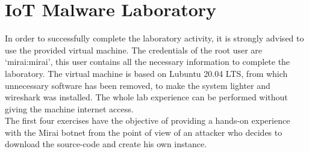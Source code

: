 \chapter{IoT Malware Laboratory}
In order to successfully complete the laboratory activity, it is strongly advised to use the provided virtual machine. The credentials of the root user are `mirai:mirai', this user contains all the necessary information to complete the laboratory. The virtual machine is based on Lubuntu 20.04 LTS, from which unnecessary software has been removed, to make the system lighter and wireshark was installed. The whole lab experience can be performed without giving the machine internet access. \\
The first four exercises have the objective of providing a hands-on experience with the Mirai botnet from the point of view of an attacker who decides to download the source-code and create his own instance.

